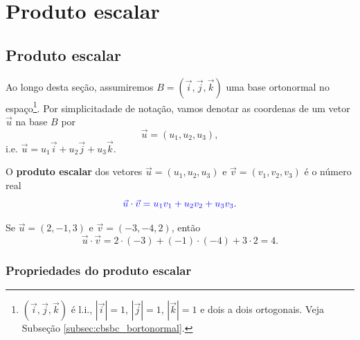 
\chapter{Produto escalar}\label{cap_prodesc}
\thispagestyle{fancy}

\section{Produto escalar}\label{cap_prodesc_sec_prodesc}

Ao longo desta seção, assumiremos $B = (\vec{i},\vec{j},\vec{k})$ uma base ortonormal no espaço\footnote{$(\vec{i},\vec{j},\vec{k})$ é l.i., $|\vec{i}|=1$, $|\vec{j}|=1$, $|\vec{k}|=1$ e dois a dois ortogonais. Veja Subseção \ref{subsec:cbsbc_bortonormal}.}. Por simplicitadade de notação, vamos denotar as coordenas de um vetor $\vec{u}$ na base $B$ por
\begin{equation}
  \vec{u} = (u_1, u_2, u_3),
\end{equation}
i.e. $\vec{u} = u_1\vec{i} + u_2\vec{j} + u_3\vec{k}$.

O {\color{blue}\bf produto escalar} dos vetores $\vec{u} = (u_1,u_2,u_3)$ e $\vec{v}=(v_1,v_2,v_3)$ é o número real
\begin{equation}\label{eq:prodesc_ortonormal}
  {\color{blue}\vec{u}\cdot\vec{v} = u_1v_1+u_2v_2+u_3v_3}.
\end{equation}

\begin{ex}
  Se $\vec{u}=(2,-1,3)$ e $\vec{v}=(-3,-4,2)$, então
  \begin{equation}
    \vec{u}\cdot\vec{v} = 2\cdot(-3)+(-1)\cdot(-4)+3\cdot 2 = 4.
  \end{equation}
\end{ex}

\subsection{Propriedades do produto escalar}


